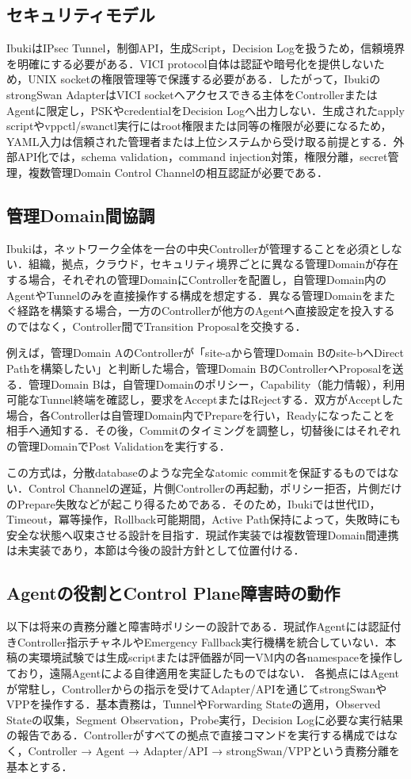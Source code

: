 \documentclass[11pt,a4paper,twoside]{ltjsarticle}
\begin{document}
\subsection{セキュリティモデル}
IbukiはIPsec Tunnel，制御API，生成Script，Decision Logを扱うため，信頼境界を明確にする必要がある．VICI protocol自体は認証や暗号化を提供しないため，UNIX socketの権限管理等で保護する必要がある\cite{strongswan-vici}．したがって，IbukiのstrongSwan AdapterはVICI socketへアクセスできる主体をControllerまたはAgentに限定し，PSKやcredentialをDecision Logへ出力しない．生成されたapply scriptやvppctl/swanctl実行にはroot権限または同等の権限が必要になるため，YAML入力は信頼された管理者または上位システムから受け取る前提とする．外部API化では，schema validation，command injection対策，権限分離，secret管理，複数管理Domain Control Channelの相互認証が必要である．

\subsection{管理Domain間協調}
Ibukiは，ネットワーク全体を一台の中央Controllerが管理することを必須としない．組織，拠点，クラウド，セキュリティ境界ごとに異なる管理Domainが存在する場合，それぞれの管理DomainにControllerを配置し，自管理Domain内のAgentやTunnelのみを直接操作する構成を想定する．異なる管理Domainをまたぐ経路を構築する場合，一方のControllerが他方のAgentへ直接設定を投入するのではなく，Controller間でTransition Proposalを交換する．

例えば，管理Domain AのControllerが「site-aから管理Domain Bのsite-bへDirect Pathを構築したい」と判断した場合，管理Domain BのControllerへProposalを送る．管理Domain Bは，自管理Domainのポリシー，Capability（能力情報），利用可能なTunnel終端を確認し，要求をAcceptまたはRejectする．双方がAcceptした場合，各Controllerは自管理Domain内でPrepareを行い，Readyになったことを相手へ通知する．その後，Commitのタイミングを調整し，切替後にはそれぞれの管理DomainでPost Validationを実行する．

この方式は，分散databaseのような完全なatomic commitを保証するものではない．Control Channelの遅延，片側Controllerの再起動，ポリシー拒否，片側だけのPrepare失敗などが起こり得るためである．そのため，Ibukiでは世代ID，Timeout，冪等操作，Rollback可能期間，Active Path保持によって，失敗時にも安全な状態へ収束させる設計を目指す．現試作実装では複数管理Domain間連携は未実装であり，本節は今後の設計方針として位置付ける．

\subsection{Agentの役割とControl Plane障害時の動作}
以下は将来の責務分離と障害時ポリシーの設計である．現試作Agentには認証付きController指示チャネルやEmergency Fallback実行機構を統合していない．本稿の実環境試験では生成scriptまたは評価器が同一VM内の各namespaceを操作しており，遠隔Agentによる自律適用を実証したものではない．
各拠点にはAgentが常駐し，Controllerからの指示を受けてAdapter/APIを通じてstrongSwanやVPPを操作する．基本責務は，TunnelやForwarding Stateの適用，Observed Stateの収集，Segment Observation，Probe実行，Decision Logに必要な実行結果の報告である．Controllerがすべての拠点で直接コマンドを実行する構成ではなく，Controller → Agent → Adapter/API → strongSwan/VPPという責務分離を基本とする．
\end{document}
